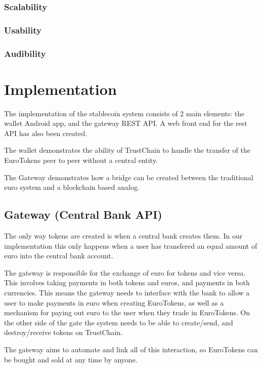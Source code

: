 \documentclass[whitelogo]{tudelft-report}
\begin{document}
\subsection{Scalability}\label{scalability}

\subsection{Usability}\label{usability}

\subsection{Audibility}\label{audibility}

\chapter{Implementation}\label{implementation}

The implementation of the stablecoin system consists of 2 main elements:
the wallet Android app, and the gateway REST API. A web front end for
the rest API has also been created.

The wallet demonstrates the ability of TrustChain to handle the transfer
of the EuroTokens peer to peer without a central entity.

The Gateway demonstrates how a bridge can be created between the
traditional euro system and a blockchain based analog.

\section{Gateway (Central Bank API)}\label{gateway-central-bank-api}

The only way tokens are created is when a central bank creates them. In
our implementation this only happens when a user has transfered an equal
amount of euro into the central bank account.

The gateway is responsible for the exchange of euro for tokens and vice
versa. This involves taking payments in both tokens and euros, and
payments in both currencies. This means the gateway needs to interface
with the bank to allow a user to make payments in euro when creating
EuroTokens, as well as a mechanism for paying out euro to the user when
they trade in EuroTokens. On the other side of the gate the system needs
to be able to create/send, and destroy/receive tokens on TrustChain.

The gateway aims to automate and link all of this interaction, so
EuroTokens can be bought and sold at any time by anyone.
\end{document}
